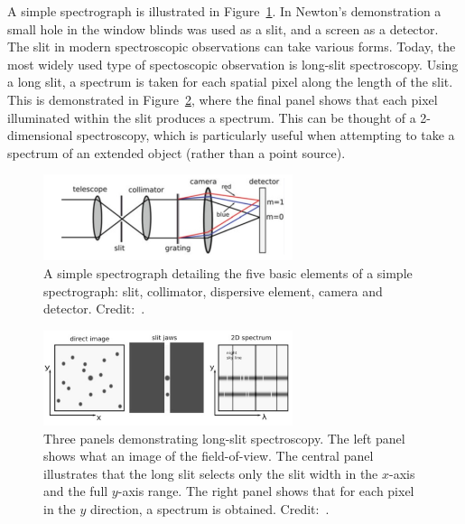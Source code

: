 A simple spectrograph is illustrated in Figure~\ref{fig:spectrograph}.
In Newton's demonstration a small hole in the window blinds was used as a slit, and a screen as a detector.
The slit in modern spectroscopic observations can take various forms.
Today, the most widely used type of spectoscopic observation is long-slit spectroscopy.
Using a long slit, a spectrum is taken for each spatial pixel along the length of the slit.
This is demonstrated in Figure~\ref{fig:long-slit}, where the final panel shows that each pixel illuminated within the slit produces a spectrum.
This can be thought of a 2-dimensional spectroscopy, which is particularly useful when attempting to take a spectrum of an extended object
(rather than a point source).

\begin{figure}
 \centering
 \includegraphics[width=0.65\textwidth]{kmos/Lawrence-spectrograph}
 \caption[A simple spectrograph]{A simple spectrograph detailing the five basic elements of a simple spectrograph: slit, collimator, dispersive element, camera and detector.
 Credit:~\cite{2014amcg.book.....L}.
 \label{fig:spectrograph}}
\end{figure}

\begin{figure}
 \centering
 \includegraphics[width=0.65\textwidth]{kmos/Lawrence-long-slit}
 \caption[Long-slit spectroscopy]{Three panels demonstrating long-slit spectroscopy.
 The left panel shows what an image of the field-of-view.
 The central panel illustrates that the long slit selects only the slit width in the $x$-axis and the full $y$-axis range.
 The right panel shows that for each pixel in the $y$ direction, a spectrum is obtained.
 Credit:~\cite{2014amcg.book.....L}.
 \label{fig:long-slit}}
\end{figure}

